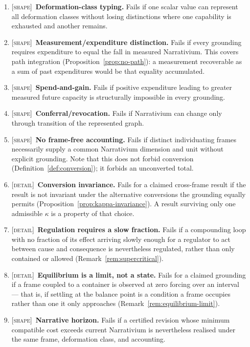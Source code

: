 \documentclass[11pt,a4paper]{article}
\theoremstyle{remark}
\begin{document}
\begin{enumerate}[leftmargin=*]
\item \textsc{[shape]}~\textbf{Deformation-class typing.} Fails if one scalar value can represent all deformation classes without losing distinctions where one capability is exhausted and another remains.
\item \textsc{[shape]}~\textbf{Measurement/expenditure distinction.} Fails if every grounding requires expenditure to equal the fall in measured Narrativium. This covers path integration (Proposition~\ref{prop:no-path}): a measurement recoverable as a sum of past expenditures would be that equality accumulated.
\item \textsc{[shape]}~\textbf{Spend-and-gain.} Fails if positive expenditure leading to greater measured future capacity is structurally impossible in every grounding.
\item \textsc{[shape]}~\textbf{Conferral/revocation.} Fails if Narrativium can change only through transition of the represented graph.
\item \textsc{[shape]}~\textbf{No frame-free accounting.} Fails if distinct individuating frames necessarily supply a common Narrativium dimension and unit without explicit grounding. Note that this does not forbid conversion (Definition~\ref{def:conversion}); it forbids an unconverted total.
\item \textsc{[detail]}~\textbf{Conversion invariance.} Fails for a claimed cross-frame result if the result is not invariant under the alternative conversions the grounding equally permits (Proposition~\ref{prop:kappa-invariance}). A result surviving only one admissible $\kappa$ is a property of that choice.
\item \textsc{[detail]}~\textbf{Regulation requires a slow fraction.} Fails if a compounding loop with no fraction of its effect arriving slowly enough for a regulator to act between cause and consequence is nevertheless regulated, rather than only contained or allowed (Remark~\ref{rem:supercritical}).
\item \textsc{[detail]}~\textbf{Equilibrium is a limit, not a state.} Fails for a claimed grounding if a frame coupled to a container is observed at zero forcing over an interval --- that is, if settling at the balance point is a condition a frame occupies rather than one it only approaches (Remark~\ref{rem:equilibrium-limit}).
\item \textsc{[shape]}~\textbf{Narrative horizon.} Fails if a certified revision whose minimum compatible cost exceeds current Narrativium is nevertheless realised under the same frame, deformation class, and accounting.

\end{enumerate}
\end{document}
